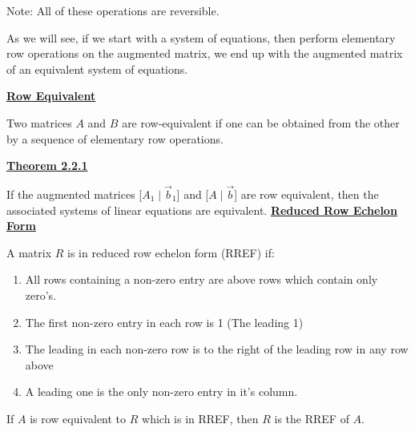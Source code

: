\documentclass{letter}
\newcommand{\0}[1]{\begin{bmatrix}#1\end{bmatrix}}
\newcommand{\h}[1]{\underline{\textbf{#1}}}
\begin{document}
	Note: All of these operations are reversible.
	
	As we will see, if we start with a system of equations, then perform elementary row operations on the augmented matrix, we end up with the augmented matrix of an equivalent system of equations.
	
	\h{Row Equivalent}
	
	Two matrices $A$ and $B$ are row-equivalent if one can be obtained from the other by a sequence of elementary row operations.
	
	\h{Theorem 2.2.1}
	
	If the augmented matrices [$ A_1 \mid \vec b_1 $] and [$A \mid \vec b$] are row equivalent, then the associated systems of linear equations are equivalent.
	\clearpage
	\h{Reduced Row Echelon Form}
	
	A matrix $R$ is in reduced row echelon form (RREF) if:
	
	\begin{enumerate}
		\item All rows containing a non-zero entry are above rows which contain only zero's.
		\item The first non-zero entry in each row is 1 (The leading 1)
		\item The leading in each non-zero row is to the right of the leading row in any row above
		\item A leading one is the only non-zero entry in it's column.
	\end{enumerate}
	
	If $A$ is row equivalent to $R$ which is in RREF, then $R$ is the RREF of $A$.
\end{document}
